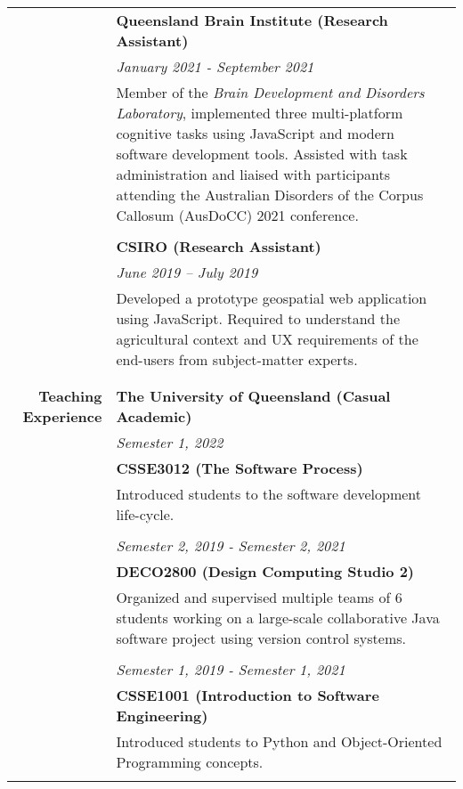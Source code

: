 \documentclass{article}
\begin{document}
\begin{longtable}{>{\columncolor{LeftColumn}}r | p{13cm}}
											& \large\textbf{Queensland Brain Institute (Research Assistant)} \\
											& \textit{January 2021 - September 2021} \\
											& Member of the \textit{Brain Development and Disorders Laboratory}, implemented three multi-platform cognitive tasks using JavaScript and modern software development tools. Assisted with task administration and liaised with participants attending the Australian Disorders of the Corpus Callosum (AusDoCC) 2021 conference. \\ 
											& \\

											& \large\textbf{CSIRO (Research Assistant)} \\
	 										& \textit{June 2019 – July 2019} \\
	 										& Developed a prototype geospatial web application using JavaScript. Required to understand the agricultural context and UX requirements of the end-users from subject-matter experts. \\
	 										& \\
	 										\hline \\

		\large\textbf{Teaching Experience}	& \large\textbf{The University of Queensland (Casual Academic)} \\
											& \textit{Semester 1, 2022} \\
											& \textbf{CSSE3012 (The Software Process)} \\
											& Introduced students to the software development life-cycle. \\
											& \\

											& \textit{Semester 2, 2019 - Semester 2, 2021} \\
											& \textbf{DECO2800 (Design Computing Studio 2)} \\
											& Organized and supervised multiple teams of 6 students working on a large-scale collaborative Java software project using version control systems. \\
											& \\
											
											& \textit{Semester 1, 2019 - Semester 1, 2021 } \\
											& \textbf{CSSE1001 (Introduction to Software Engineering)} \\
											& Introduced students to Python and Object-Oriented Programming concepts. \\
											& \\
											

\end{longtable}
\end{document}
